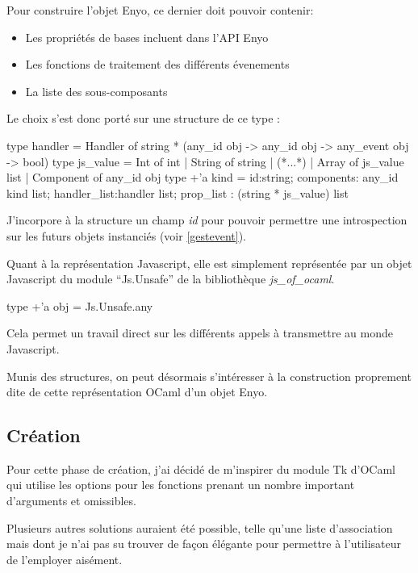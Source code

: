 \documentclass[11pt,a4paper]{report}
\begin{document}
Pour construire l'objet Enyo, ce dernier doit pouvoir contenir:
\begin{itemize}
\item Les propriétés de bases incluent dans l'API Enyo
\item Les fonctions de traitement des différents évenements
\item La liste des sous-composants
\end{itemize}

Le choix s'est donc porté sur une structure de ce type :

\begin{OCaml}
  type handler = Handler of string * (any_id obj -> any_id obj -> any_event obj -> bool)
  type js_value = Int of int | String of string 
                | (*...*) 
                | Array of js_value list 
                | Component of any_id obj 
  type +'a kind = {id:string; 
                   components: any_id kind list; 
                   handler_list:handler list; 
                   prop_list : (string * js_value) list 
                  }
\end{OCaml}

J'incorpore à la structure un champ \emph{id} pour pouvoir permettre une introspection 
sur les futurs objets instanciés (voir \ref{gestevent}).

Quant à la représentation Javascript, elle est simplement représentée par un objet Javascript
du module ``Js.Unsafe'' de la bibliothèque \emph{js\_of\_ocaml}.

\begin{OCaml}
  type +'a obj = Js.Unsafe.any
\end{OCaml}

Cela permet un travail direct sur les différents appels à transmettre au monde Javascript.

Munis des structures, on peut désormais s'intéresser à la construction proprement dite de cette
représentation OCaml d'un objet Enyo.

\subsection{Création}

Pour cette phase de création, j'ai décidé de m'inspirer du module Tk d'OCaml qui utilise les options
pour les fonctions prenant un nombre important d'arguments et omissibles.

Plusieurs autres solutions auraient été possible, telle qu'une liste d'association mais dont
je n'ai pas su trouver de façon élégante pour permettre à l'utilisateur de l'employer aisément.
\end{document}

